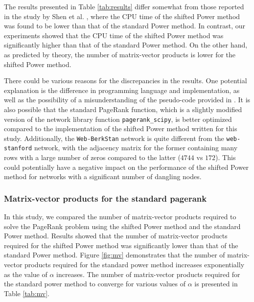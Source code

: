\noindent The results presented in Table \ref{tab:results} differ somewhat from those reported in the study by Shen et al. \cite{SHEN2022126799}, where the CPU time of the shifted Power method was found to be lower than that of the standard Power method. In contrast, our experiments showed that the CPU time of the shifted Power method was significantly higher than that of the standard Power method. On the other hand, as predicted by theory, the number of matrix-vector products is lower for the shifted Power method. \vspace*{0.5cm}


\noindent There could be various reasons for the discrepancies in the results. One potential explanation is the difference in programming language and implementation, as well as the possibility of a misunderstanding of the pseudo-code provided in \cite{SHEN2022126799}. It is also possible that the standard PageRank function, which is a slightly modified version of the network library function \texttt{pagerank\_scipy}, is better optimized compared to the implementation of the shifted Power method written for this study. Additionally, the \texttt{Web-BerkStan} network is quite different from the \texttt{web-stanford} network, with the adjacency matrix for the former containing many rows with a large number of zeros compared to the latter ($4744$ vs $172$). This could potentially have a negative impact on the performance of the shifted Power method for networks with a significant number of dangling nodes.

\subsubsection{Matrix-vector products for the standard pagerank}

In this study, we compared the number of matrix-vector products required to solve the PageRank problem using the shifted Power method and the standard Power method. Results showed that the number of matrix-vector products required for the shifted Power method was significantly lower than that of the standard Power method. Figure \ref{fig:mv} demonstrates that the number of matrix-vector products required for the standard power method increases exponentially as the value of $\alpha$ increases. The number of matrix-vector products required for the standard power method to converge for various values of $\alpha$ is presented in Table \ref{tab:mv}.


